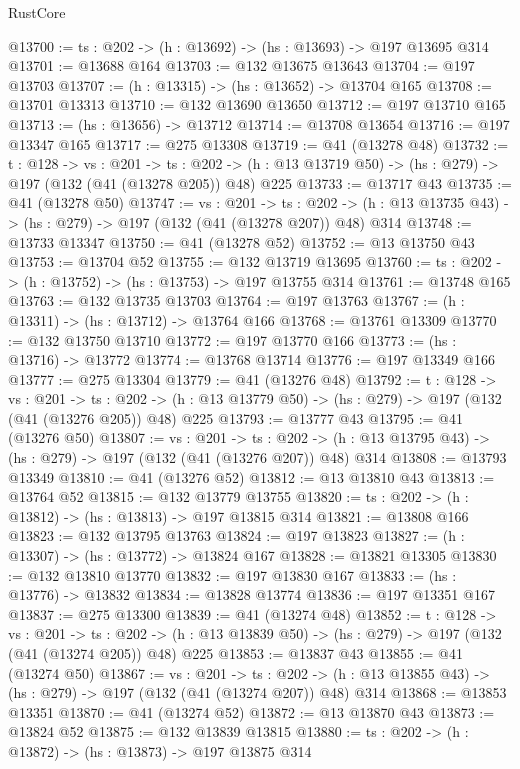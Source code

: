 \begin{lexlean}{RustCore}
\begin{coremodule}
@13700 := {ts : @202} -> (h : @13692) -> (hs : @13693) -> @197 @13695 @314
@13701 := @13688 @164
@13703 := @132 @13675 @13643
@13704 := @197 @13703
@13707 := (h : @13315) -> (hs : @13652) -> @13704 @165
@13708 := @13701 @13313
@13710 := @132 @13690 @13650
@13712 := @197 @13710 @165
@13713 := (hs : @13656) -> @13712
@13714 := @13708 @13654
@13716 := @197 @13347 @165
@13717 := @275 @13308
@13719 := @41 (@13278 @48)
@13732 := {t : @128} ->
  {vs : @201} ->
  {ts : @202} -> (h : @13 @13719 @50) -> (hs : @279) -> @197 (@132 (@41 (@13278 @205)) @48) @225
@13733 := @13717 @43
@13735 := @41 (@13278 @50)
@13747 := {vs : @201} ->
  {ts : @202} -> (h : @13 @13735 @43) -> (hs : @279) -> @197 (@132 (@41 (@13278 @207)) @48) @314
@13748 := @13733 @13347
@13750 := @41 (@13278 @52)
@13752 := @13 @13750 @43
@13753 := @13704 @52
@13755 := @132 @13719 @13695
@13760 := {ts : @202} -> (h : @13752) -> (hs : @13753) -> @197 @13755 @314
@13761 := @13748 @165
@13763 := @132 @13735 @13703
@13764 := @197 @13763
@13767 := (h : @13311) -> (hs : @13712) -> @13764 @166
@13768 := @13761 @13309
@13770 := @132 @13750 @13710
@13772 := @197 @13770 @166
@13773 := (hs : @13716) -> @13772
@13774 := @13768 @13714
@13776 := @197 @13349 @166
@13777 := @275 @13304
@13779 := @41 (@13276 @48)
@13792 := {t : @128} ->
  {vs : @201} ->
  {ts : @202} -> (h : @13 @13779 @50) -> (hs : @279) -> @197 (@132 (@41 (@13276 @205)) @48) @225
@13793 := @13777 @43
@13795 := @41 (@13276 @50)
@13807 := {vs : @201} ->
  {ts : @202} -> (h : @13 @13795 @43) -> (hs : @279) -> @197 (@132 (@41 (@13276 @207)) @48) @314
@13808 := @13793 @13349
@13810 := @41 (@13276 @52)
@13812 := @13 @13810 @43
@13813 := @13764 @52
@13815 := @132 @13779 @13755
@13820 := {ts : @202} -> (h : @13812) -> (hs : @13813) -> @197 @13815 @314
@13821 := @13808 @166
@13823 := @132 @13795 @13763
@13824 := @197 @13823
@13827 := (h : @13307) -> (hs : @13772) -> @13824 @167
@13828 := @13821 @13305
@13830 := @132 @13810 @13770
@13832 := @197 @13830 @167
@13833 := (hs : @13776) -> @13832
@13834 := @13828 @13774
@13836 := @197 @13351 @167
@13837 := @275 @13300
@13839 := @41 (@13274 @48)
@13852 := {t : @128} ->
  {vs : @201} ->
  {ts : @202} -> (h : @13 @13839 @50) -> (hs : @279) -> @197 (@132 (@41 (@13274 @205)) @48) @225
@13853 := @13837 @43
@13855 := @41 (@13274 @50)
@13867 := {vs : @201} ->
  {ts : @202} -> (h : @13 @13855 @43) -> (hs : @279) -> @197 (@132 (@41 (@13274 @207)) @48) @314
@13868 := @13853 @13351
@13870 := @41 (@13274 @52)
@13872 := @13 @13870 @43
@13873 := @13824 @52
@13875 := @132 @13839 @13815
@13880 := {ts : @202} -> (h : @13872) -> (hs : @13873) -> @197 @13875 @314

\end{coremodule}
\end{lexlean}
